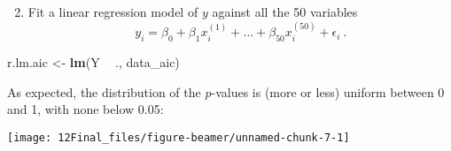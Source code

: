 \documentclass[10pt,ignorenonframetext,]{beamer}
\newenvironment{Shaded}{\begin{snugshade}}{\end{snugshade}}
\newcommand{\DataTypeTok}[1]{\textcolor[rgb]{0.13,0.29,0.53}{#1}}
\newcommand{\DecValTok}[1]{\textcolor[rgb]{0.00,0.00,0.81}{#1}}
\newcommand{\KeywordTok}[1]{\textcolor[rgb]{0.13,0.29,0.53}{\textbf{#1}}}
\newcommand{\NormalTok}[1]{#1}
\newcommand{\OperatorTok}[1]{\textcolor[rgb]{0.81,0.36,0.00}{\textbf{#1}}}
\newcommand{\StringTok}[1]{\textcolor[rgb]{0.31,0.60,0.02}{#1}}
\providecommand{\tightlist}{%
  \setlength{\itemsep}{0pt}\setlength{\parskip}{0pt}}
\begin{document}
\begin{frame}[fragile]

\begin{enumerate}
\setcounter{enumi}{1}
\tightlist
\item
  Fit a linear regression model of \(y\) against all the 50 variables
  \begin{equation*}
  y_i = \beta_0 + \beta_1 x_i^{(1)} + \ldots + \beta_{50}x_i^{(50)} + \epsilon_i \ .
  \end{equation*}
\end{enumerate}

\scriptsize

\begin{Shaded}
\begin{Highlighting}[]
\NormalTok{r.lm.aic <-}\StringTok{ }\KeywordTok{lm}\NormalTok{(Y }\OperatorTok{~}\StringTok{ }\NormalTok{., data_aic)}
\end{Highlighting}
\end{Shaded}

\normalsize

As expected, the distribution of the \(p\)-values is (more or less)
uniform between 0 and 1, with none below 0.05:

\scriptsize
\center

\begin{Shaded}
\end{Shaded}

\texttt{[image: 12Final\_files/figure-beamer/unnamed-chunk-7-1]}

\end{frame}
\end{document}
